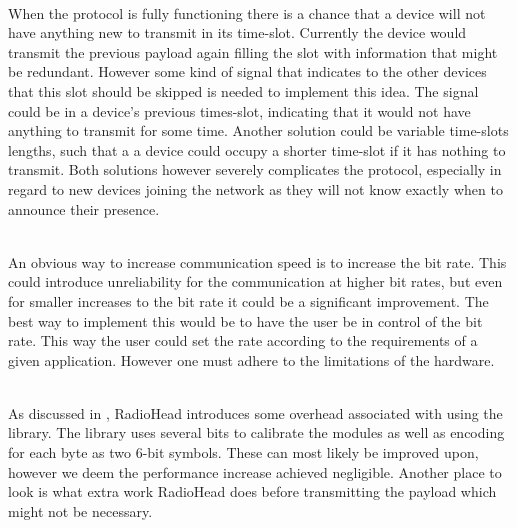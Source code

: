 \begin{description}[labelindent=\parindent]
    \item [Skip unnecessary transmissions]\hfill\\
When the protocol is fully functioning there is a chance that a device will not have anything new to transmit in its time-slot.
Currently the device would transmit the previous payload again filling the slot with information that might be redundant.
However some kind of signal that indicates to the other devices that this slot should be skipped is needed to implement this idea.
The signal could be in a device's previous times-slot, indicating that it would not have anything to transmit for some time. 
Another solution could be variable time-slots lengths, such that a a device could occupy a shorter time-slot if it has nothing to transmit. 
Both solutions however severely complicates the protocol, especially in regard to new devices joining the network as they will not know exactly when to announce their presence.

    \item[Increase the bit rate]\hfill\\ 
An obvious way to increase communication speed is to increase the bit rate.
This could introduce unreliability for the communication at higher bit rates, but even for smaller increases to the bit rate it could be a significant improvement.
The best way to implement this would be to have the user be in control of the bit rate.
This way the user could set the rate according to the requirements of a given application.
However one must adhere to the limitations of the hardware.

    \item[Reduce overhead]\hfill\\
As discussed in , RadioHead introduces some overhead associated with using the library.
The library uses several bits to calibrate the modules as well as encoding for each byte as two 6-bit symbols.
These can most likely be improved upon, however we deem the performance increase achieved negligible.
Another place to look is what extra work RadioHead does before transmitting the payload which might not be necessary.
\end{description}


